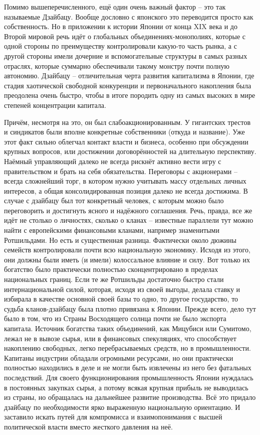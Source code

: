 Помимо вышеперечисленного, ещё один очень важный фактор – это так называемые Дзайбацу. Вообще дословно с японского это переводится просто как собственность. Но в приложении к истории Японии от конца XIX века и до Второй мировой речь идёт о глобальных объединениях-монополиях, которые с одной стороны по преимуществу контролировали какую-то часть рынка, а с другой стороны имели дочерние и вспомогательные структуры в самых разных отраслях, которые суммарно обеспечивали такому монстру почти полную автономию. Дзайбацу – отличительная черта развития капитализма в Японии, где стадия хаотической свободной конкуренции и первоначального накопления была преодолена очень быстро, чтобы в итоге породить одну из самых высоких в мире степеней концентрации капитала.

Причём, несмотря на это, он был слабоакционированным. У гигантских трестов и синдикатов были вполне конкретные собственники (откуда и название). Уже этот факт сильно облегчал контакт власти и бизнеса, особенно при обсуждении крупных вопросов, или достижении договорённостей на длительную перспективу. Наёмный управляющий далеко не всегда рискнёт активно вести игру с правительством и брать на себя обязательства. Переговоры с акционерами – всегда сложнейший торг, в котором нужно учитывать массу отдельных личных интересов, а общая консолидированная позиция далеко не всегда достижима. В случае с дзайбацу был тот конкретный человек, с которым можно было переговорить и достигнуть ясного и надёжного соглашения.
Речь, правда, все же идёт не столько о личностях, сколько о кланах – известные параллели тут можно найти с европейскими финансовыми кланами, например знаменитыми Ротшильдами. Но есть и существенная разница. Фактически около дюжины семейств контролировали почти всю национальную экономику. Исходя из этого, они должны были иметь (и имели) колоссальное влияние и силу. Вот только их богатство было практически полностью сконцентрировано в пределах национальных границ. Если те же Ротшильды достаточно быстро стали интернациональной силой, которая, исходя из своей выгоды, делала ставку и избирала в качестве основной своей базы то одно, то другое государство, то судьба кланов-дзайбацу была плотно привязана к Японии. Прежде всего, дело тут было в том, что из Страны Восходящего солнца почти не было экспорта капитала. Источник богатства таких объединений, как Мицубиси или Сумитомо, лежал не в вывозе сырья, или в финансовых спекуляциях, что способствует накоплению свободных, легко перебрасываемых средств, но в промышленности. Капитаны индустрии обладали огромными ресурсами, но они практически полностью находились в деле и не могли быть извлечены из него без фатальных последствий. Для своего функционирования промышленность Японии нуждалась в постоянных закупках сырья, а потому всякая крупная прибыль не выводилась из страны, но обращалась на дальнейшее развитие производства. Всё это придало дзайбацу по необходимости ярко выраженную национальную ориентацию. И заставило искать путей для компромисса и взаимопонимания с высшей политической власти вместо жесткого давления на неё.

